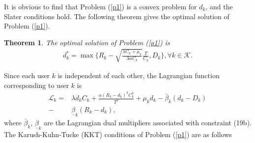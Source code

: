 \documentclass[journal]{IEEEtran}
\newtheorem{theorem}{\bf Theorem}
\begin{document}
%
%

It is obvious to find that Problem (\ref{p1}) is a convex problem for $d_k$, and the Slater conditions hold. The following theorem gives the optimal solution of Problem (\ref{p1}).
\begin{theorem}
	The optimal solution of Problem (\ref{p1}) is
	\begin{align}
	d^*_k=\max \{R_k-\sqrt{\frac{\lambda C_k+\mu_k}{3\alpha C_k}}\frac{T}{C_k}, D_k\}, \forall k\in \mathcal K.
	\end{align}
\end{theorem}

	Since each user $k$ is independent of each other, the Lagrangian function corresponding to user $k$ is
	\begin{align}\label{p111}
	\mathcal L_k=& \lambda d_kC_k+\frac{\alpha \left(R_{k}-d_{k}\right)^3C^3_k}{T^2}+\mu_kd_k-\bar \beta_k(d_k-D_k)\\\nonumber-&\underline\beta_k(R_k-d_k),
	\end{align}
	where $\bar \beta_k$, $\underline\beta_k$ are the Lagrangian dual multipliers associated with constraint (19b). The Karush-Kuhn-Tucke (KKT) conditions of Problem (\ref{p1}) are as follows
	
\end{document}
